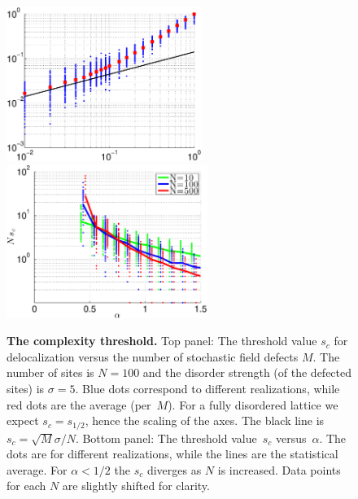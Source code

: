 \documentclass[aps,pre,floats,floatfix,twocolumn]{revtex4}
\newcommand{\Eq}[1]{\textcolor{blue}{{equation}\!~(\ref{#1})}}
\begin{document}
\begin{figure}
\includegraphics[height=5cm]{s_c_sparse_100_loglog}
\includegraphics[height=5cm]{s_c_vs_alpha}

\caption{\label{figSc}
{\bf The complexity threshold.}
%
Top panel: The threshold value $s_c$ for delocalization versus the number of stochastic field defects $M$. 
The number of sites is $N{=}100$ and the disorder strength (of the defected sites) is $\sigma{=}5$. 
Blue dots correspond to different realizations, while red dots are the average (per~$M$). 
For a fully disordered lattice we expect $s_c=s_{1/2}$, hence the scaling of the axes. 
The black line is $s_c=\sqrt{M}\sigma/N$. %
%
Bottom panel: The threshold value~$s_c$ versus~$\alpha$. 
The dots are for different realizations, while the lines are the statistical average.  
For ${\alpha<1/2}$ the $s_c$ diverges as $N$ is increased.  
Data points for each $N$ are slightly shifted for clarity.
}
\end{figure}
\end{document}
